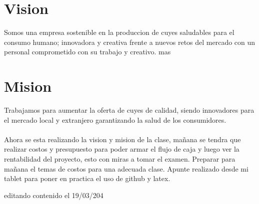 \documentclass[11pt]{article}
\begin{document}
\section{Vision}
Somos una empresa sostenible en la produccion de cuyes saludables para el consumo humano; innovadora y creativa frente a nuevos retos del mercado con un personal comprometido con su trabajo y creativo.
    mas
\section{Mision}
Trabajamos para aumentar la oferta de cuyes de calidad, siendo innovadores para el mercado local y extranjero garantizando la salud de los consumidores.\\
\\
Ahora se esta realizando la vision y mision de la clase, mañana se tendra que realizar costos y presupuesto para poder armar el flujo de caja y luego ver la rentabilidad del proyecto, esto con miras a tomar el examen. Preparar para mañana el temas de costos para una adecuada clase. Apunte realizado desde mi tablet para poner en practica el uso de github y latex.

editando contenido el 19/03/204
\end{document}
